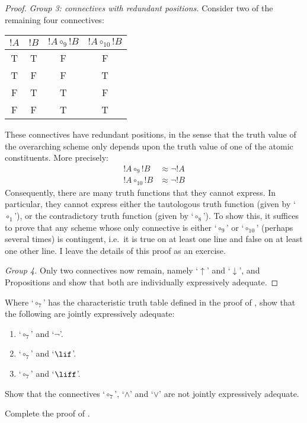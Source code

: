 \documentclass[../../../include/open-logic-section]{subfiles}
\begin{document}
\begin{thm}
\begin{proof}
		\emph{Group 3: connectives with redundant positions.} 
		Consider two of the remaining four connectives:
		
	\begin{center}
		\begin{tabular}{c c | c c}
		${!A}$ & ${!B}$ & ${!A} \mathrel{\circ_9} {!B}$ & ${!A} \mathrel{\circ_{10}} {!B}$\\
		\hline
			 T & T & F & F \\
			 T & F & F & T\\
			 F & T & T & F \\
			 F & F & T & T
	\end{tabular}
	\end{center}
	These connectives have redundant positions, in the sense that the truth value of the overarching scheme only depends upon the truth value of one of the atomic constituents. More precisely:
		\begin{align*}
		 	{!A} \circ_9 {!B} &\approx \lnot {!A}\\
			{!A} \circ_{10} {!B} &\approx \lnot {!B}
		\end{align*}
		Consequently, there are many truth functions that they cannot express. In particular, they cannot express either the tautologous truth function (given by `$\circ_1$'), or the contradictory truth function (given by `$\circ_8$'). To show this, it suffices to prove that any scheme whose only connective is either `$\circ_9$' or `$\circ_{10}$' (perhaps several times) is contingent, i.e.\ it is true on at least one line and false on at least one other line. I leave the details of this proof as an exercise.
		
		\emph{Group 4.} Only two connectives now remain, namely `$\uparrow$' and `$\downarrow$', and 	Propositions  and  show that both are individually expressively adequate.
		\end{proof}
	\end{thm}

\begin{prob}
 Where `$\circ_7$' has the characteristic truth table defined in the proof of , show that the following are jointly expressively adequate:
	\begin{enumerate}
		\item `$\circ_7$' and `$\lnot$'. %
		\item `$\circ_7$' and `$\lif$'. %
		\item `$\circ_7$' and `$\liff$'. %
	\end{enumerate}
\end{prob}

\begin{prob}
Show that the connectives `$\circ_7$', `$\land$' and `$\lor$' are not jointly expressively adequate.\\
\end{prob}

\begin{prob}
Complete the proof of .
\end{prob}

 
\end{document}
